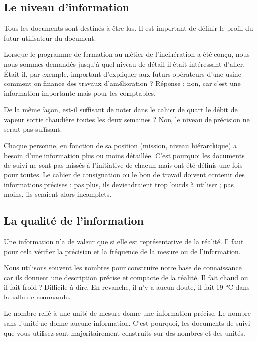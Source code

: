 \subsection{Le niveau d'information}

Tous les documents sont destinés à être lus. Il est important de définir le profil du futur utilisateur du document.
\vspace{0.3cm}

Lorsque le programme de formation au métier de l’incinération a été conçu, nous nous sommes demandés jusqu’à quel niveau de détail il était intéressant d’aller. Était-il, par exemple, important d’expliquer aux futurs opérateurs d’une usine comment on finance des travaux d’amélioration ? Réponse : non, car c’est une information importante mais pour les comptables.
\vspace{0.3cm}

De la même façon, est-il suffisant de noter dans le cahier de quart le débit de vapeur sortie chaudière toutes les deux semaines ? Non, le niveau de précision ne serait pas suffisant.
\vspace{0.3cm}

Chaque personne, en fonction de sa position (mission, niveau hiérarchique) a besoin d’une information plus ou moins détaillée. C’est pourquoi les documents de suivi ne sont pas laissés à l’initiative de chacun mais ont été définis une fois pour toutes. Le cahier de consignation ou le bon de travail doivent contenir des informations précises : pas plus, ils deviendraient trop lourds à utiliser ; pas moins, ils seraient alors incomplets.

\subsection{La qualité de l’information} 

Une information n’a de valeur que si elle est représentative de la réalité. Il faut pour cela vérifier la précision et la fréquence de la mesure ou de l’information.
\vspace{0.3cm}

Nous utilisons souvent les nombres pour construire notre base de connaissance car ils donnent une description précise et compacte de la réalité. Il fait chaud ou il fait froid ? Difficile à dire. En revanche, il n’y a aucun doute, il fait 19 °C dans la salle de commande.
\vspace{0.3cm}

Le nombre relié à une unité de mesure donne une information précise. Le nombre sans l’unité ne donne aucune information. C’est pourquoi, les documents de suivi que vous utilisez sont majoritairement construits sur des nombres et des unités.
\vspace{0.3cm}

